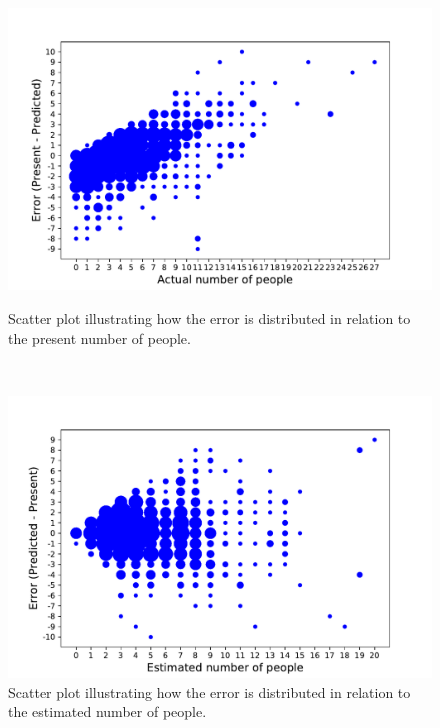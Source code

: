 

\begin{figure}[h!]
\begin{minipage}[b]{8.5cm}
\centering
\includegraphics[width=1\textwidth]{images/scatterplotpres}
\caption{Scatter plot illustrating how the error is distributed in relation to the present number of people.}
\label{fig:scatterplotpres}
\end{minipage}
\ \hspace{2mm} \hspace{3mm} \
\begin{minipage}[b]{8.5cm}
\centering
\includegraphics[width=1\textwidth]{images/scatterplotest}
\caption{Scatter plot illustrating how the error is distributed in relation to the estimated number of people.}
\label{fig:scatterplotest}
\end{minipage}
\end{figure}

